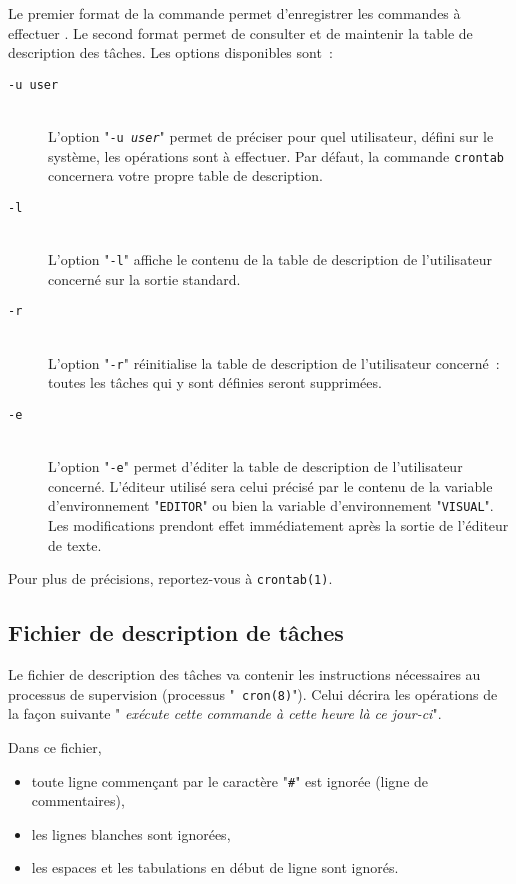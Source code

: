 Le premier format de la commande permet d'enregistrer les commandes {\`a} effectuer .
Le second format permet de consulter et de maintenir la table de description des
t{\^a}ches.
Les options disponibles sont~:
\begin{description}
	\item[{\tt -u user}]\mbox{}\\
		L'option "{\tt -u {\sl user}}" permet de pr{\'e}ciser pour  quel utilisateur, d{\'e}fini
		sur le syst{\`e}me, les op{\'e}rations sont {\`a} effectuer. Par d{\'e}faut, la commande
		{\tt crontab} concernera votre propre table de description.

	\item[{\tt -l}]\mbox{}\\
		L'option "{\tt -l}" affiche le contenu de la table de description de
		l'utilisateur concern{\'e} sur la sortie standard.

	\item[{\tt -r}]\mbox{}\\
		L'option "{\tt -r}" r{\'e}initialise la table de description de l'utilisateur
		concern{\'e}~: toutes les t{\^a}ches qui y sont d{\'e}finies seront supprim{\'e}es.

	\item[{\tt -e}]\mbox{}\\
		L'option "{\tt -e}" permet d'{\'e}diter la table de description de l'utilisateur
		concern{\'e}. L'{\'e}diteur utilis{\'e} sera celui pr{\'e}cis{\'e} par le contenu de la variable
		d'environnement "{\tt EDITOR}" ou bien la variable d'environnement
		"{\tt VISUAL}". Les modifications prendont effet imm{\'e}diatement apr{\`e}s la sortie
		de l'{\'e}diteur de texte.
\end{description}

Pour plus de pr{\'e}cisions, reportez-vous {\`a} {\tt crontab(1)}.

\subsection{Fichier de description de t{\^a}ches}

Le fichier de description des t{\^a}ches va contenir les instructions
n{\'e}cessaires au processus de supervision (processus "{\tt
cron(8)}"). Celui d{\'e}crira les op{\'e}rations de la fa\c{c}on suivante "{\sl
ex{\'e}cute cette commande {\`a} cette heure l{\`a} ce jour-ci}".

Dans ce fichier,
\begin{itemize}
	\item	toute ligne commen\c{c}ant par le caract{\`e}re "\verb=#=" est ignor{\'e}e (ligne
			de commentaires),
	\item	les lignes blanches sont ignor{\'e}es,
	\item	les espaces et les tabulations en d{\'e}but de ligne sont ignor{\'e}s.
\end{itemize}

